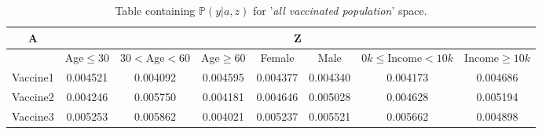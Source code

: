 \documentclass{article}
\begin{document}


\begin{center}
\begin{table}[H]
\begin{adjustbox}{max width=\textwidth}
    \begin{tabular}{ |c| c c c c c c c|}
        \hline
          A  & \multicolumn{7}{c|}{Z} \\
          \hline
          & Age$\leq30$ &    $30<$Age$<60$ &     Age$\geq60$ &    Female &      Male &   $0k\leq$Income$<10k$ &    Income$\geq10k$  \\
        \hline
        Vaccine1 &  0.004521 &  0.004092 &  0.004595 &  0.004377 &  0.004340 &  0.004173 &  0.004686 \\
        Vaccine2 &  0.004246 &  0.005750 &  0.004181 &  0.004646 &  0.005028 &  0.004628 &  0.005194 \\
        Vaccine3 &  0.005253 &  0.005862 &  0.004021 &  0.005237 &  0.005521 &  0.005662 &  0.004898
         \\ \hline
    \end{tabular}
    \end{adjustbox}
    \caption{Table containing $\mathbb{P}(y | a, z)$ for '\textit{all vaccinated population}' space.}
    \label{tab:6}
\end{table}
\end{center}
\end{document}
